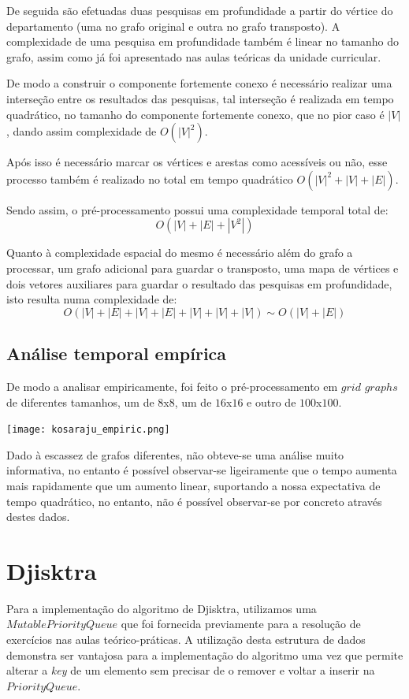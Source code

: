\documentclass[article, a4paper, 12pt, oneside]{memoir}
\begin{document}
De seguida são efetuadas duas pesquisas em profundidade a partir do vértice do departamento (uma no grafo original e outra no grafo transposto). A complexidade de uma pesquisa em profundidade também é linear no tamanho do grafo, assim como já foi apresentado nas aulas teóricas da unidade curricular.

De modo a construir o componente fortemente conexo é necessário realizar uma interseção entre os resultados das pesquisas, tal interseção é realizada em tempo quadrático, no tamanho do componente fortemente conexo, que no pior caso é $|V|$, dando assim complexidade de $O(|V|^2)$.

Após isso é necessário marcar os vértices e arestas como acessíveis ou não, esse processo também é realizado no total em tempo quadrático $O(|V|^2 + |V|+|E|)$.

Sendo assim, o pré-processamento possui uma complexidade temporal total de:
\begin{equation}
O(|V|+|E|+|V^2|)
\end{equation}

Quanto à complexidade espacial do mesmo é necessário além do grafo a processar, um grafo adicional para guardar o transposto, uma mapa de vértices e dois vetores auxiliares para guardar o resultado das pesquisas em profundidade, isto resulta numa complexidade de:
\begin{equation}
O(|V|+|E|+|V|+|E|+|V|+|V|+|V|) \sim O(|V|+|E|)
\end{equation}

\subsection{Análise temporal empírica}
De modo a analisar empiricamente, foi feito o pré-processamento em $grid$ $graphs$ de diferentes tamanhos, um de $8$x$8$, um de $16$x$16$ e outro de $100$x$100$.

\begin{center}
\texttt{[image: kosaraju\_empiric.png]}
\end{center}

Dado à escassez de grafos diferentes, não obteve-se uma análise muito informativa, no entanto é possível observar-se ligeiramente que o tempo aumenta mais rapidamente que um aumento linear, suportando a nossa expectativa de tempo quadrático, no entanto, não é possível observar-se por concreto através destes dados.

\section{Djisktra}
Para a implementação do algoritmo de Djisktra, utilizamos uma $MutablePriorityQueue$ que foi fornecida previamente para a resolução de exercícios nas aulas teórico-práticas.
A utilização desta estrutura de dados demonstra ser vantajosa para a implementação do algoritmo uma vez que permite
alterar a \textit{key} de um elemento sem precisar de o remover e voltar a inserir na $PriorityQueue$.
\end{document}
